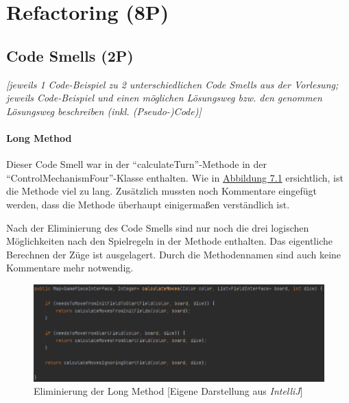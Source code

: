 
\newpage
\titlespacing*{\chapter}{0pt}{-30mm}{10pt}
  
\chapter{Refactoring (8P)}
\pagestyle{scrheadings}
\clearscrheadfoot
{}
\setcounter{page}{29}
\ofoot[\pagemark]{\pagemark}
\onehalfspacing

\section{Code Smells (2P)}
\emph{[jeweils 1 Code-Beispiel zu 2 unterschiedlichen Code Smells aus der Vorlesung; jeweils Code-Beispiel
und einen möglichen Lösungsweg bzw. den genommen Lösungsweg beschreiben (inkl. (Pseudo-)Code)]}

\subsubsection{Long Method}
\noindent Dieser Code Smell war in der \enquote{calculateTurn}-Methode in der \enquote{ControlMechanismFour}-Klasse enthalten. Wie in \hyperref[fig:longmethod]{Abbildung 7.1} ersichtlich, ist die Methode viel zu lang. Zusätzlich mussten noch Kommentare eingefügt werden, dass die Methode überhaupt einigermaßen verständlich ist. 

Nach der Eliminierung des Code Smells sind nur noch die drei logischen Möglichkeiten nach den Spielregeln in der Methode enthalten. Das eigentliche Berechnen der Züge ist ausgelagert. Durch die Methodennamen sind auch keine Kommentare mehr notwendig.

\begin{figure}[htbp]
\centering
\centerline{\includegraphics[scale=.5]{longmethodsolution}}
\caption{Eliminierung der Long Method [Eigene Darstellung aus \emph{IntelliJ}]}
\label{fig:longmethodsolution}
\end{figure}

